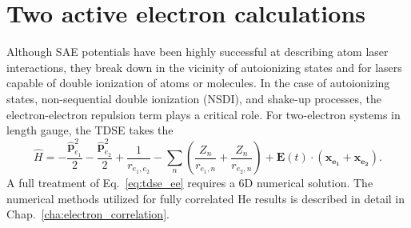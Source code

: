 \section{Two active electron calculations} %
\label{sec:two_active_electron_time_calculations}
Although SAE potentials have been highly successful at describing atom laser interactions, they break down in the vicinity of autoionizing states and for lasers capable of double ionization of atoms or molecules. In the case of autoionizing states, non-sequential double ionization (NSDI), and shake-up processes, the electron-electron repulsion term plays a critical role. For two-electron systems in length gauge, the TDSE takes the 
\begin{equation}
    \label{eq:tdse_ee}
    \hat{H} = -\frac{\hat{\mathbf{p}}^2_{e_1}}{2} - \frac{\hat{\mathbf{p}}^2_{e_2}}{2}  + \frac{1}{r_{e_1, e_2}} - \sum_{n} \left(\frac{Z_n}{r_{e_1,n}}+\frac{Z_n}{r_{e_2,n}}\right) + \mathbf{E}(t) \cdot (\mathbf{x_{e_1}} + \mathbf{x_{e_2}}).
\end{equation}
A full treatment of Eq.~\ref{eq:tdse_ee} requires a 6D numerical solution. The numerical methods utilized for fully correlated He results is described in detail in Chap.~\ref{cha:electron_correlation}.


